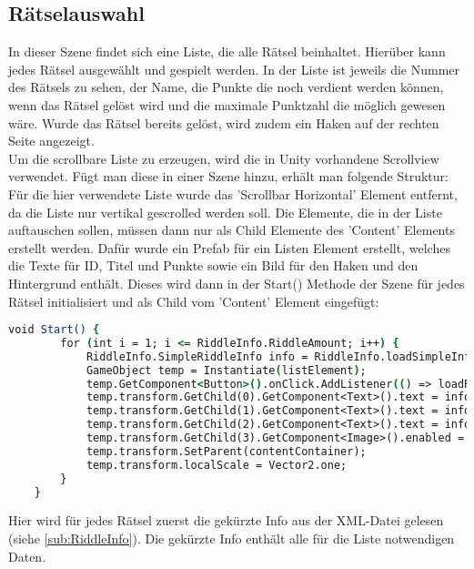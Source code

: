 {\subsection{Rätselauswahl}
In dieser Szene findet sich eine Liste, die alle Rätsel beinhaltet. Hierüber kann jedes Rätsel ausgewählt und gespielt werden.
In der Liste ist jeweils die Nummer des Rätsels zu sehen, der Name, die Punkte die noch verdient werden können, wenn das Rätsel gelöst wird und die maximale Punktzahl die möglich gewesen wäre. Wurde das Rätsel bereits gelöst, wird zudem ein Haken auf der rechten Seite angezeigt.\\
Um die scrollbare Liste zu erzeugen, wird die in Unity vorhandene Scrollview verwendet.
Fügt man diese in einer Szene hinzu, erhält man folgende Struktur:
Für die hier verwendete Liste wurde das 'Scrollbar Horizontal' Element entfernt, da die Liste nur vertikal gescrolled werden soll. Die Elemente, die in der Liste auftauschen sollen, müssen dann nur als Child Elemente des 'Content' Elements erstellt werden. Dafür wurde ein Prefab für ein Listen Element erstellt, welches die Texte für ID, Titel und Punkte sowie ein Bild für den Haken und den Hintergrund enthält. Dieses wird dann in der Start() Methode der Szene für jedes Rätsel initialisiert und als Child vom 'Content' Element eingefügt:
\begin{lstlisting}[language=csh, caption={Start Methode der Rätsel Liste, welche die Listenelemente erstellt}]
void Start() {
        for (int i = 1; i <= RiddleInfo.RiddleAmount; i++) {
            RiddleInfo.SimpleRiddleInfo info = RiddleInfo.loadSimpleInfoFromXML(i);
            GameObject temp = Instantiate(listElement);
            temp.GetComponent<Button>().onClick.AddListener(() => loadRiddleScene(info.id));
            temp.transform.GetChild(0).GetComponent<Text>().text = info.id.ToString("000");
            temp.transform.GetChild(1).GetComponent<Text>().text = info.title;
            temp.transform.GetChild(2).GetComponent<Text>().text = info.points + "/" + info.maxPoints;
            temp.transform.GetChild(3).GetComponent<Image>().enabled = info.completed;
            temp.transform.SetParent(contentContainer);
            temp.transform.localScale = Vector2.one;
        }
    }
\end{lstlisting}
Hier wird für jedes Rätsel zuerst die gekürzte Info aus der XML-Datei gelesen (siehe \ref{sub:RiddleInfo}). Die gekürzte Info enthält alle für die Liste notwendigen Daten.
}
